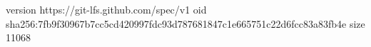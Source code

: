 version https://git-lfs.github.com/spec/v1
oid sha256:7fb9f30967b7cc5cd420997fdc93d787681847c1e665751c22d6fcc83a83fb4e
size 11068
